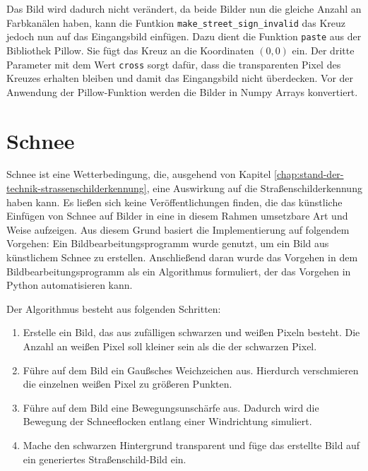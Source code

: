Das Bild wird dadurch nicht verändert, da beide Bilder nun die gleiche Anzahl an Farbkanälen haben, kann die Funtkion \texttt{make_street_sign_invalid} das Kreuz jedoch nun auf das Eingangsbild einfügen. Dazu dient die Funktion \texttt{paste} aus der Bibliothek Pillow. Sie fügt das Kreuz an die Koordinaten $(0,0)$ ein. Der dritte Parameter mit dem Wert \texttt{cross} sorgt dafür, dass die transparenten Pixel des Kreuzes erhalten bleiben und damit das Eingangsbild nicht überdecken. Vor der Anwendung der Pillow-Funktion werden die Bilder in Numpy Arrays konvertiert. \cite{pillow}

\section{Schnee}

Schnee ist eine Wetterbedingung, die, ausgehend von Kapitel \ref{chap:stand-der-technik-strassenschilderkennung}, eine Auswirkung auf die Straßenschilderkennung haben kann. Es ließen sich keine Veröffentlichungen finden, die das künstliche Einfügen von Schnee auf Bilder in eine in diesem Rahmen umsetzbare Art und Weise aufzeigen. Aus diesem Grund basiert die Implementierung auf folgendem Vorgehen: Ein Bildbearbeitungsprogramm wurde genutzt, um ein Bild aus künstlichem Schnee zu erstellen. Anschließend daran wurde das Vorgehen in dem Bildbearbeitungsprogramm als ein Algorithmus formuliert, der das Vorgehen in Python automatisieren kann.

Der Algorithmus besteht aus folgenden Schritten:
\begin{enumerate}
  \item Erstelle ein Bild, das aus zufälligen schwarzen und weißen Pixeln besteht. Die Anzahl an weißen Pixel soll kleiner sein als die der schwarzen Pixel.
  \item Führe auf dem Bild ein Gaußsches Weichzeichen aus. Hierdurch verschmieren die einzelnen weißen Pixel zu größeren Punkten.
  \item Führe auf dem Bild eine Bewegungsunschärfe aus. Dadurch wird die Bewegung der Schneeflocken entlang einer Windrichtung simuliert.
  \item Mache den schwarzen Hintergrund transparent und füge das erstellte Bild auf ein generiertes Straßenschild-Bild ein.
\end{enumerate}

